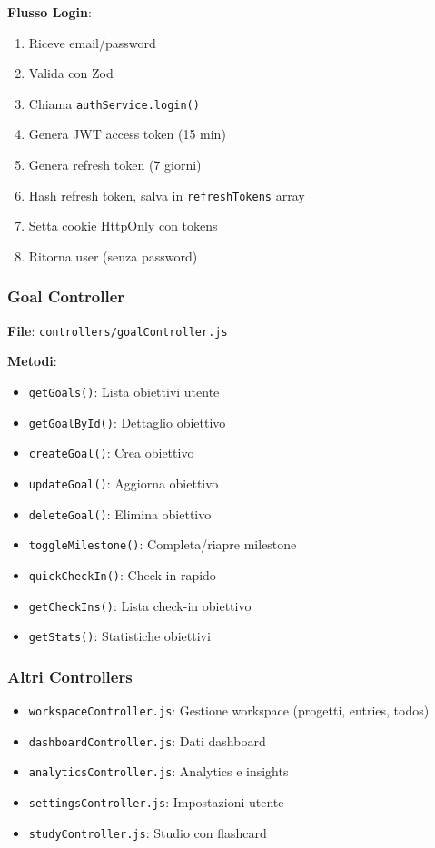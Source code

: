 \documentclass[11pt,a4paper]{article}
\begin{document}
\textbf{Flusso Login}:
\begin{enumerate}
    \item Riceve email/password
    \item Valida con Zod
    \item Chiama \texttt{authService.login()}
    \item Genera JWT access token (15 min)
    \item Genera refresh token (7 giorni)
    \item Hash refresh token, salva in \texttt{refreshTokens} array
    \item Setta cookie HttpOnly con tokens
    \item Ritorna user (senza password)
\end{enumerate}

\subsubsection{Goal Controller}

\textbf{File}: \texttt{controllers/goalController.js}

\textbf{Metodi}:
\begin{itemize}
    \item \texttt{getGoals()}: Lista obiettivi utente
    \item \texttt{getGoalById()}: Dettaglio obiettivo
    \item \texttt{createGoal()}: Crea obiettivo
    \item \texttt{updateGoal()}: Aggiorna obiettivo
    \item \texttt{deleteGoal()}: Elimina obiettivo
    \item \texttt{toggleMilestone()}: Completa/riapre milestone
    \item \texttt{quickCheckIn()}: Check-in rapido
    \item \texttt{getCheckIns()}: Lista check-in obiettivo
    \item \texttt{getStats()}: Statistiche obiettivi
\end{itemize}

\subsubsection{Altri Controllers}

\begin{itemize}
    \item \texttt{workspaceController.js}: Gestione workspace (progetti, entries, todos)
    \item \texttt{dashboardController.js}: Dati dashboard
    \item \texttt{analyticsController.js}: Analytics e insights
    \item \texttt{settingsController.js}: Impostazioni utente
    \item \texttt{studyController.js}: Studio con flashcard
\end{itemize}
\end{document}
